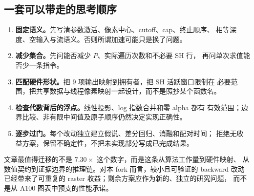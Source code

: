 \subsection{一套可以带走的思考顺序}

\begin{enumerate}
 \item \textbf{固定语义。}先写清参数激活、像素中心、cutoff、cap、终止顺序、
 相等深度、空输入与流语义。否则所谓加速可能只是换了问题。
 \item \textbf{减少集合。}先问能否减少 $P$、实际遍历次数和不必要 SH 行，
 再问单次求值能否少一条指令。
 \item \textbf{匹配硬件形状。}把 9 项输出映射到拥有者，把 SH 活跃窗口限制在
 必要范围，把共享数据与线程像素映射一起设计，而不是照抄某个函数名。
 \item \textbf{检查代数背后的浮点。}线性投影、log 指数合并和零 alpha 都有
 有效范围；边界比较、非有限中间值及原子顺序仍然决定实现正确性。
 \item \textbf{逐步过门。}每个改动独立建立假说、差分回归、消融和配对时间；
 拒绝无收益方案，保留不确定性，不把未实现部分写成已完成结果。
\end{enumerate}

文章最值得迁移的不是 $7.30\times$ 这个数字，而是这条从算法工作量到硬件映射、
从数值契约到证据边界的推理链。对本 fork 而言，较小且可验证的 backward 改动
已经带来了可重复的 raster 收益；剩余方案应作为新的、独立的研究问题，
而不是从 A100 图表中预支的性能承诺。
